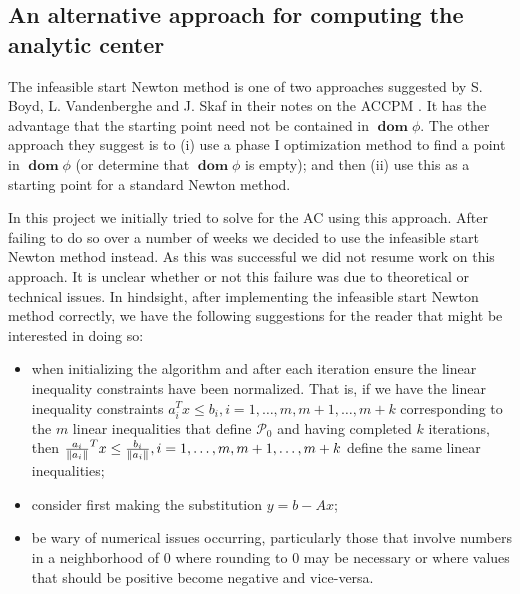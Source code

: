 \documentclass[11pt]{amsart}
\theoremstyle{definition}
\theoremstyle{remark}
\newcommand{\transpose}{T}
\DeclareMathOperator{\domain}{\textbf{dom}}
\begin{document}
    \subsection{An alternative approach for computing the analytic center}
        The infeasible start Newton method is one of two approaches suggested by S. Boyd, L. Vandenberghe and J. Skaf in their notes on the ACCPM \cite[p. 3]{BVS08}. It has the advantage that the starting point need not be contained in $\domain \phi$. The other approach they suggest is to (i) use a phase I optimization method \cite[Section 11.4]{BV04} to find a point in $\domain \phi$ (or determine that $\domain \phi$ is empty); and then (ii) use this as a starting point for a standard Newton method. 

        In this project we initially tried to solve for the AC using this approach. After failing to do so over a number of weeks we decided to use the infeasible start Newton method instead. As this was successful we did not resume work on this approach. It is unclear whether or not this failure was due to theoretical or technical issues. In hindsight, after implementing the infeasible start Newton method correctly, we have the following suggestions for the reader that might be interested in doing so:
        \begin{itemize}
            \item when initializing the algorithm and after each iteration ensure the linear inequality constraints have been normalized. That is, if we have the linear inequality constraints $a_i^\transpose x \leq b_i, i = 1, \dots, m, m + 1, \dots, m + k$ corresponding to the $m$ linear inequalities that define $\mathcal{P}_0$ and having completed $k$ iterations, then $\frac{a_i}{\norm{a_i}}^\transpose x \leq \frac{b_i}{\norm{a_i}}, i = 1, \dots, m, m + 1, \dots, m + k$ define the same linear inequalities;
            \item consider first making the substitution $y = b - Ax$;
            \item be wary of numerical issues occurring, particularly those that involve numbers in a neighborhood of $0$ where rounding to $0$ may be necessary or where values that should be positive become negative and vice-versa.
        \end{itemize}
\end{document}
